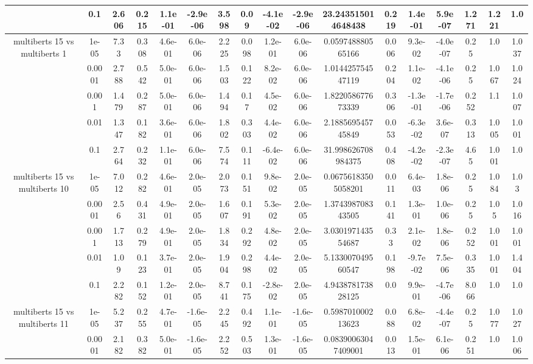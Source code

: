 \begin{tabular}{|c|c|c|c|c|c|c|c|c|c|c|c|c|c|c|c|c|}
 & 0.1 & 2.606 & 0.215 & 1.1e-01 & -2.9e-06 & 3.598 & 0.09 & -4.1e-02 & -2.9e-06 & 23.243515014648438 & 0.219 & 1.4e-01 & 5.9e-07 & 1.271 & 1.221 & 1.0 \\
\hline
\multirow{5}{*}{multiberts 15 vs multiberts 1} & 1e-05 & 7.33 & 0.308 & 4.6e-01 & 6.0e-06 & 2.225 & 0.098 & 1.2e-01 & 6.0e-06 & 0.059748880565166 & 0.006 & 9.3e-02 & -4.0e-07 & 0.25 & 1.0 & 1.037 \\
 & 0.0001 & 2.788 & 0.542 & 5.0e-01 & 6.0e-06 & 1.503 & 0.122 & 8.2e-02 & 6.0e-06 & 1.014425754547119 & 0.204 & 1.1e-02 & -4.1e-06 & 0.25 & 1.067 & 1.024 \\
 & 0.001 & 1.479 & 0.287 & 5.0e-01 & 6.0e-06 & 1.494 & 0.17 & 4.5e-02 & 6.0e-06 & 1.822058677673339 & 0.306 & -1.3e-01 & -1.7e-06 & 0.252 & 1.1 & 1.007 \\
 & 0.01 & 1.347 & 0.182 & 3.6e-01 & 6.0e-06 & 1.802 & 0.303 & 4.4e-02 & 6.0e-06 & 2.188569545745849 & 0.053 & -6.3e-02 & 3.6e-07 & 0.313 & 1.005 & 1.001 \\
 & 0.1 & 2.764 & 0.232 & 1.1e-01 & 6.0e-06 & 7.574 & 0.111 & -6.4e-02 & 6.0e-06 & 31.998626708984375 & 0.408 & -4.2e-02 & -2.3e-07 & 4.65 & 1.001 & 1.0 \\
\hline
\multirow{5}{*}{multiberts 15 vs multiberts 10} & 1e-05 & 7.012 & 0.282 & 4.6e-01 & 2.0e-05 & 2.073 & 0.151 & 9.8e-02 & 2.0e-05 & 0.06756183505058201 & 0.011 & 6.4e-03 & 1.8e-06 & 0.25 & 1.084 & 1.03 \\
 & 0.0001 & 2.56 & 0.431 & 4.9e-01 & 2.0e-05 & 1.607 & 0.191 & 5.3e-02 & 2.0e-05 & 1.374398708343505 & 0.141 & 1.3e-01 & 1.0e-06 & 0.25 & 1.05 & 1.016 \\
 & 0.001 & 1.713 & 0.279 & 4.9e-01 & 2.0e-05 & 1.834 & 0.292 & 4.8e-02 & 2.0e-05 & 3.030197143554687 & 0.33 & 2.1e-02 & 1.8e-06 & 0.252 & 1.001 & 1.001 \\
 & 0.01 & 1.09 & 0.123 & 3.7e-01 & 2.0e-05 & 1.904 & 0.298 & 4.4e-02 & 2.0e-05 & 5.133007049560547 & 0.198 & -9.7e-02 & 7.5e-06 & 0.335 & 1.001 & 1.404 \\
 & 0.1 & 2.282 & 0.152 & 1.2e-01 & 2.0e-05 & 8.741 & 0.175 & -2.8e-02 & 2.0e-05 & 4.943878173828125 & 0.0 & 9.9e-01 & -4.7e-06 & 8.066 & 1.0 & 1.0 \\
\hline
\multirow{5}{*}{multiberts 15 vs multiberts 11} & 1e-05 & 5.237 & 0.255 & 4.7e-01 & -1.6e-05 & 2.245 & 0.492 & 1.1e-01 & -1.6e-05 & 0.598701000213623 & 0.088 & 6.8e-02 & -4.4e-07 & 0.25 & 1.077 & 1.027 \\
 & 0.0001 & 2.182 & 0.382 & 5.0e-01 & -1.6e-05 & 2.252 & 0.503 & 1.3e-01 & -1.6e-05 & 0.08390063047409001 & 0.013 & 1.5e-01 & 6.1e-06 & 0.251 & 1.0 & 1.006 \\

\end{tabular}
